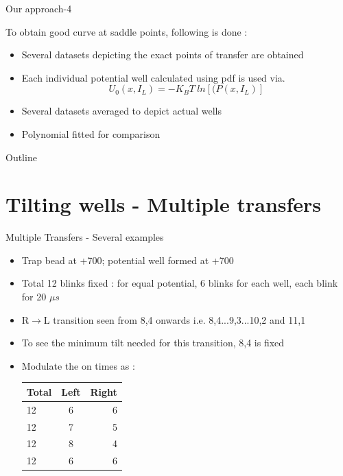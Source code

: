 \documentclass{beamer}
\begin{document}
\begin{frame}{Our approach-4} 

To obtain good curve at saddle points, following is done :
\begin{itemize}

\item Several datasets depicting the exact points of transfer are obtained
\item Each individual potential well calculated using pdf is used via.
\begin{equation*}
U_0(x,I_L) = -K_BT~ln[(P(x,I_L)]
\end{equation*}
\item Several datasets averaged to depict actual wells
\item Polynomial fitted for comparison

\end{itemize}

\end{frame}

\begin{frame}{Outline}
  \tableofcontents  %
\end{frame}
\section{Tilting wells - Multiple transfers}
\begin{frame}{Multiple Transfers - Several examples} 

\begin{itemize}

\item Trap bead at +700; potential well formed at +700
\item Total 12 blinks fixed : for equal potential, 6 blinks for each well, each blink for 20 $\mu s$
\item R$\rightarrow$L transition seen from 8,4 onwards i.e. 8,4...9,3...10,2 and 11,1
\item To see the minimum tilt needed for this transition, 8,4 is fixed
\item Modulate the on times as :

\begin{center} 
\begin{tabular}{| l | c | r |} 
\hline Total & Left & Right \\ 
\hline 12 & 6 & 6 \\ 
\hline 12 & 7 & 5 \\ 
\hline 12 & 8 & 4 \\ 
\hline \hline 12 & 6 & 6 \\ 
\hline \end{tabular} 
\end{center}

\end{itemize}

\end{frame}
\end{document}
